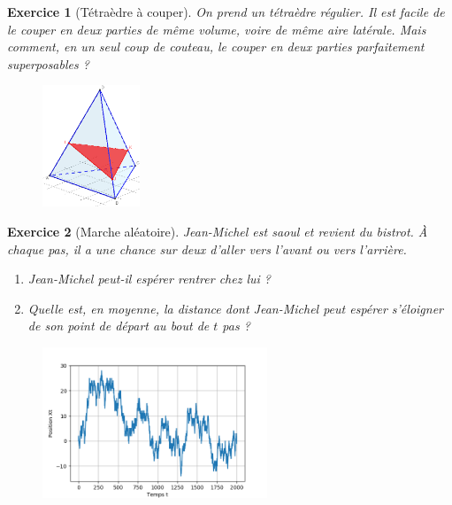 \documentclass[12pt]{article}
\theoremstyle{break}
\newtheorem{exo}{Exercice}
\begin{document}
\begin{exo}[Tétraèdre à couper]
On prend un tétraèdre régulier. Il est facile de le couper en deux parties de même volume, voire de même aire latérale. Mais comment, en un seul coup de couteau, le couper en deux parties parfaitement superposables ?

\begin{figure}[h!]
	\centering
    \includegraphics[width=0.26\textwidth]{images/CoupeTetraedre.png}
\end{figure}
\end{exo}


\begin{exo}[Marche aléatoire]
Jean-Michel est saoul et revient du bistrot. À chaque pas, il a une chance sur deux d'aller vers l'avant ou vers l'arrière.
\begin{enumerate}
\item Jean-Michel peut-il espérer rentrer chez lui ?
\item Quelle est, en moyenne, la distance dont Jean-Michel peut espérer s'éloigner de son point de départ au bout de $t$ pas ?
\end{enumerate}

\begin{figure}[!ht]
\centering
\includegraphics[width=0.6\textwidth]{images/marcheJM.png}
\end{figure}

\end{exo}
\end{document}
